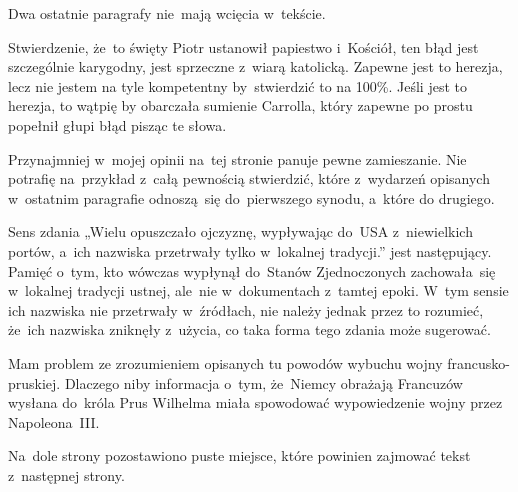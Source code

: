 \documentclass[a4paper,11pt]{article}
\begin{document}
\vspace{\spaceFour}



\start {} Dwa ostatnie paragrafy nie~mają wcięcia w~tekście.

\vspace{\spaceFour}



\start {} Stwierdzenie, że~to święty Piotr ustanowił papiestwo
i~Kościół, ten błąd jest szczególnie karygodny, jest sprzeczne
z~wiarą katolicką. Zapewne jest to herezja, lecz nie jestem na tyle
kompetentny by~stwierdzić to na 100\%. Jeśli jest to herezja, to
wątpię by obarczała sumienie Carrolla, który zapewne po prostu
popełnił głupi błąd pisząc te słowa.

\vspace{\spaceFour}



\start {} Przynajmniej w~mojej opinii na~tej stronie panuje
pewne zamieszanie. Nie potrafię na~przykład z~całą pewnością
stwierdzić, które z~wydarzeń opisanych w~ostatnim paragrafie
odnoszą~się do~pierwszego synodu, a~które do drugiego.

\vspace{\spaceFour}



\start {} Sens zdania „Wielu opuszczało ojczyznę,
wypływając do~USA z~niewielkich portów, a~ich nazwiska przetrwały
tylko w~lokalnej tradycji.” jest następujący. Pamięć o~tym, kto
wówczas wypłynął do~Stanów Zjednoczonych zachowała~się w~lokalnej
tradycji ustnej, ale~nie w~dokumentach z~tamtej epoki. W~tym sensie
ich nazwiska nie przetrwały w~źródłach, nie należy jednak przez to
rozumieć, że~ich nazwiska zniknęły z~użycia, co taka forma tego zdania
może sugerować.

\vspace{\spaceFour}



\start {} Mam problem ze zrozumieniem opisanych tu powodów
wybuchu wojny francusko-pruskiej. Dlaczego niby informacja o~tym,
że~Niemcy obrażają Francuzów wysłana do~króla Prus Wilhelma miała
spowodować wypowiedzenie wojny przez Napoleona~III.

\vspace{\spaceFour}



\start {} Na~dole strony pozostawiono puste miejsce, które
powinien zajmować tekst z~następnej strony.
\end{document}
